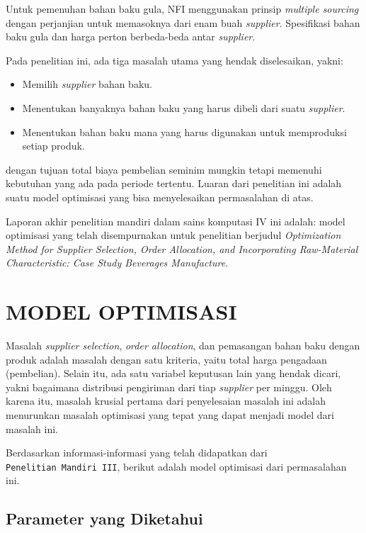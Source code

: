 \documentclass[
  12pt,
]{article}
\providecommand{\tightlist}{%
  \setlength{\itemsep}{0pt}\setlength{\parskip}{0pt}}
\begin{document}
Untuk pemenuhan bahan baku gula, NFI menggunakan prinsip \emph{multiple
sourcing} dengan perjanjian untuk memasoknya dari enam buah
\emph{supplier}. Spesifikasi bahan baku gula dan harga perton
berbeda-beda antar \emph{supplier}.

Pada penelitian ini, ada tiga masalah utama yang hendak diselesaikan,
yakni:

\begin{itemize}
\tightlist
\item
  Memilih \emph{supplier} bahan baku.
\item
  Menentukan banyaknya bahan baku yang harus dibeli dari suatu
  \emph{supplier}.
\item
  Menentukan bahan baku mana yang harus digunakan untuk memproduksi
  setiap produk.
\end{itemize}

dengan tujuan total biaya pembelian seminim mungkin tetapi memenuhi
kebutuhan yang ada pada periode tertentu. Luaran dari penelitian ini
adalah suatu model optimisasi yang bisa menyelesaikan permasalahan di
atas.

Laporan akhir penelitian mandiri dalam sains komputasi IV ini adalah:
model optimisasi yang telah disempurnakan untuk penelitian berjudul
\emph{Optimization Method for Supplier Selection, Order Allocation, and
Incorporating Raw-Material Characteristic: Case Study Beverages
Manufacture}.

\hypertarget{model-optimisasi}{%
\section{MODEL OPTIMISASI}\label{model-optimisasi}}

Masalah \emph{supplier selection}, \emph{order allocation}, dan
pemasangan bahan baku dengan produk adalah masalah dengan satu kriteria,
yaitu total harga pengadaan (pembelian). Selain itu, ada satu variabel
keputusan lain yang hendak dicari, yakni bagaimana distribusi pengiriman
dari tiap \emph{supplier} per minggu. Oleh karena itu, masalah krusial
pertama dari penyelesaian masalah ini adalah menurunkan masalah
optimisasi yang tepat yang dapat menjadi model dari masalah ini.

Berdasarkan informasi-informasi yang telah didapatkan dari
\texttt{Penelitian\ Mandiri\ III}, berikut adalah model optimisasi dari
permasalahan ini.

\hypertarget{parameter-yang-diketahui}{%
\subsection{Parameter yang Diketahui}\label{parameter-yang-diketahui}}
\end{document}
